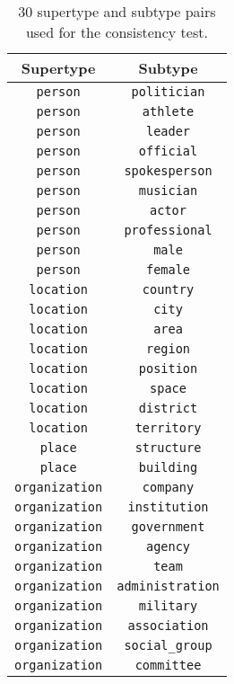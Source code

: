 \documentclass[11pt,a4paper]{article}
\begin{document}
\renewcommand{\arraystretch}{1}
\begin{table}[H]
	\centering
	\small
	\setlength{\tabcolsep}{4pt}
\begin{tabular}{c c}
\toprule
		\multicolumn{1}{c}{Supertype} & \multicolumn{1}{c}{Subtype}\\
		\midrule
        {\tt person} & {\tt politician} \\
        {\tt person} & {\tt athlete} \\
        {\tt person} & {\tt leader} \\
        {\tt person} & {\tt official} \\
        {\tt person} & {\tt spokesperson} \\
        {\tt person} & {\tt musician} \\
        {\tt person} & {\tt actor} \\
        {\tt person} & {\tt professional} \\
        {\tt person} & {\tt male} \\
        {\tt person} & {\tt female} \\
        {\tt location} & {\tt country} \\
        {\tt location} & {\tt city} \\
        {\tt location} & {\tt area} \\
        {\tt location} & {\tt region} \\
        {\tt location} & {\tt position} \\
        {\tt location} & {\tt space} \\
        {\tt location} & {\tt district} \\
        {\tt location} & {\tt territory} \\
        {\tt place} & {\tt structure} \\
        {\tt place} & {\tt building} \\
        {\tt organization} & {\tt company} \\
        {\tt organization} & {\tt institution} \\
        {\tt organization} & {\tt government} \\
        {\tt organization} & {\tt agency} \\
        {\tt organization} & {\tt team} \\
        {\tt organization} & {\tt administration} \\
        {\tt organization} & {\tt military} \\
        {\tt organization} & {\tt association} \\
        {\tt organization} & {\tt social\_group} \\
        {\tt organization} & {\tt committee} \\
		\bottomrule
	\end{tabular}
\caption{30 supertype and subtype pairs used for the consistency test.}
\label{tab:30types}
\end{table}
\end{document}
